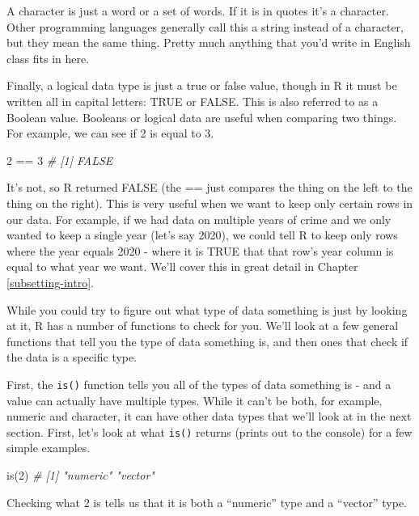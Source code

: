 \documentclass[
  a4paper,
]{krantz}
\makeatletter
\newenvironment{Shaded}{\begin{snugshade}}{\end{snugshade}}
\newcommand{\CommentTok}[1]{\textcolor[rgb]{0.37,0.37,0.37}{\textit{#1}}}
\newcommand{\DecValTok}[1]{\textcolor[rgb]{0.06,0.06,0.06}{#1}}
\newcommand{\FunctionTok}[1]{\textcolor[rgb]{0,0,0}{#1}}
\newcommand{\NormalTok}[1]{#1}
\newcommand{\SpecialCharTok}[1]{\textcolor[rgb]{0,0,0}{#1}}
\newenvironment{kframe}{%
\medskip{}
\setlength{\fboxsep}{.8em}
 \def\at@end@of@kframe{}%
 \ifinner\ifhmode%
  \def\at@end@of@kframe{\end{minipage}}%
  \begin{minipage}{\columnwidth}%
 \fi\fi%
 \def\FrameCommand##1{\hskip\@totalleftmargin \hskip-\fboxsep
 \colorbox{shadecolor}{##1}\hskip-\fboxsep
     \hskip-\linewidth \hskip-\@totalleftmargin \hskip\columnwidth}%
 \MakeFramed {\advance\hsize-\width
   \@totalleftmargin\z@ \linewidth\hsize
   \@setminipage}}%
 {\par\unskip\endMakeFramed%
 \at@end@of@kframe}
\renewenvironment{Shaded}{\begin{kframe}}{\end{kframe}}
\makeatother
\begin{document}
A character is just a word or a set of words. If it is in
quotes it's a character. Other programming languages
generally call this a string instead of a character, but
they mean the same thing. Pretty much anything that you'd
write in English class fits in here.

Finally, a logical data type is just a true or false value,
though in R it must be written all in capital letters: TRUE
or FALSE. This is also referred to as a Boolean value.
Booleans or logical data are useful when comparing two
things. For example, we can see if 2 is equal to 3.

\begin{Shaded}
\begin{Highlighting}[]
\DecValTok{2} \SpecialCharTok{==} \DecValTok{3}
\CommentTok{\# [1] FALSE}
\end{Highlighting}
\end{Shaded}

It's not, so R returned FALSE (the == just compares the
thing on the left to the thing on the right). This is very
useful when we want to keep only certain rows in our data.
For example, if we had data on multiple years of crime and
we only wanted to keep a single year (let's say 2020), we
could tell R to keep only rows where the year equals 2020 -
where it is TRUE that that row's year column is equal to
what year we want. We'll cover this in great detail in
Chapter \ref{subsetting-intro}.

While you could try to figure out what type of data
something is just by looking at it, R has a number of
functions to check for you. We'll look at a few general
functions that tell you the type of data something is, and
then ones that check if the data is a specific type.

First, the \texttt{is()} function tells you all of the types
of data something is - and a value can actually have
multiple types. While it can't be both, for example, numeric
and character, it can have other data types that we'll look
at in the next section. First, let's look at what
\texttt{is()} returns (prints out to the console) for a few
simple examples.

\begin{Shaded}
\begin{Highlighting}[]
\FunctionTok{is}\NormalTok{(}\DecValTok{2}\NormalTok{)}
\CommentTok{\# [1] "numeric" "vector"}
\end{Highlighting}
\end{Shaded}

Checking what 2 is tells us that it is both a ``numeric''
type and a ``vector'' type.
\end{document}
